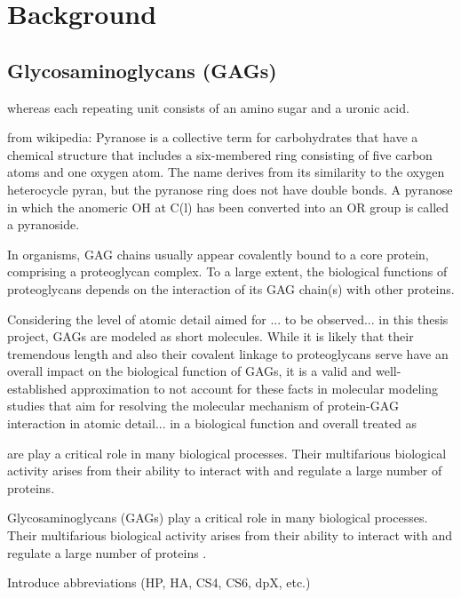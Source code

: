 \chapter{Background}
\label{background}

\section{Glycosaminoglycans (GAGs)}
\label{background:gags}

whereas each repeating unit
consists of an amino sugar and a uronic acid.

from wikipedia:
Pyranose is a collective term for carbohydrates that have a chemical structure that includes a six-membered ring consisting of five carbon atoms and one oxygen atom. The name derives from its similarity to the oxygen heterocycle pyran, but the pyranose ring does not have double bonds. A pyranose in which the anomeric OH at C(l) has been converted into an OR group is called a pyranoside.



In organisms, GAG chains usually
appear covalently bound to a core protein, comprising a proteoglycan complex.
To a large extent, the biological functions of proteoglycans depends on the
interaction of its GAG chain(s) with other proteins.



Considering the level of atomic detail aimed for ... to be observed... in this
thesis project, GAGs are modeled as short molecules. While it is likely
that their tremendous length and also their covalent linkage to proteoglycans
serve have an overall impact on the biological function of GAGs, it is a
valid and well-established approximation to not account for these facts in
molecular modeling studies that aim for resolving the molecular mechanism of
protein-GAG interaction in atomic detail... in a biological function and overall  treated as


are play a critical role in many biological processes.
Their multifarious biological activity arises from their ability to interact
with and regulate a large number of proteins.


Glycosaminoglycans (GAGs) play a critical role in many biological processes.
Their multifarious biological activity arises from their ability to interact
with and regulate a large number of proteins \cite{handel_2005}.

Introduce abbreviations (HP, HA, CS4, CS6, dpX, etc.)



